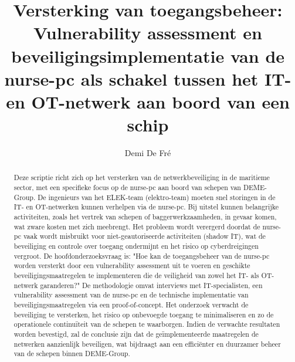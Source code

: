 \documentclass{hogent-article}
\title{Versterking van toegangsbeheer: Vulnerability assessment en 
beveiligingsimplementatie van de nurse-pc als schakel tussen het IT- en OT-netwerk aan boord van een schip}
\author{Demi De Fré}
\begin{document}
\begin{abstract}
  Deze scriptie richt zich op het versterken van de netwerkbeveiliging in de maritieme sector, met een specifieke focus op de nurse-pc aan boord van schepen van DEME-Group. 
  De ingenieurs van het ELEK-team (elektro-team) moeten snel storingen in de IT- en OT-netwerken kunnen verhelpen via de nurse-pc. 
  Bij uitstel kunnen belangrijke activiteiten, zoals het vertrek van schepen of baggerwerkzaamheden, in gevaar komen, wat zware kosten met zich meebrengt. 
  Het probleem wordt verergerd doordat de nurse-pc vaak wordt misbruikt voor niet-geautoriseerde activiteiten (shadow IT), wat de beveiliging en controle over toegang 
  ondermijnt en het risico op cyberdreigingen vergroot. De hoofdonderzoeksvraag is: "Hoe kan de toegangsbeheer van de nurse-pc worden versterkt door een vulnerability 
  assessment uit te voeren en geschikte beveiligingsmaatregelen te implementeren die de veiligheid van zowel het IT- als OT-netwerk garanderen?" 
  De methodologie omvat interviews met IT-specialisten, een vulnerability assessment van de nurse-pc en de technische implementatie van beveiligingsmaatregelen via een proof-of-concept. 
  Het onderzoek verwacht de beveiliging te versterken, het risico op onbevoegde toegang te minimaliseren en zo de operationele continuïteit van de schepen te waarborgen. 
  Indien de verwachte resultaten worden bevestigd, zal de conclusie zijn dat de geïmplementeerde maatregelen de netwerken aanzienlijk beveiligen, wat bijdraagt aan een efficiënter en duurzamer 
  beheer van de schepen binnen DEME-Group.
\end{abstract}

\tableofcontents



\printbibliography[heading=bibintoc]
\end{document}

